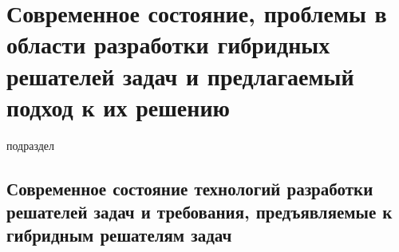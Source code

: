 \section{Современное состояние, проблемы в области разработки гибридных решателей задач и предлагаемый подход к их решению}
\label{sec_ps_problems}

\begin{SCn}
\begin{scnrelfromlist}{подраздел}
\end{scnrelfromlist}
\end{SCn}

\subsection{Современное состояние технологий разработки решателей задач и требования, предъявляемые к гибридным решателям задач}
\label{subsec_ps_req}

